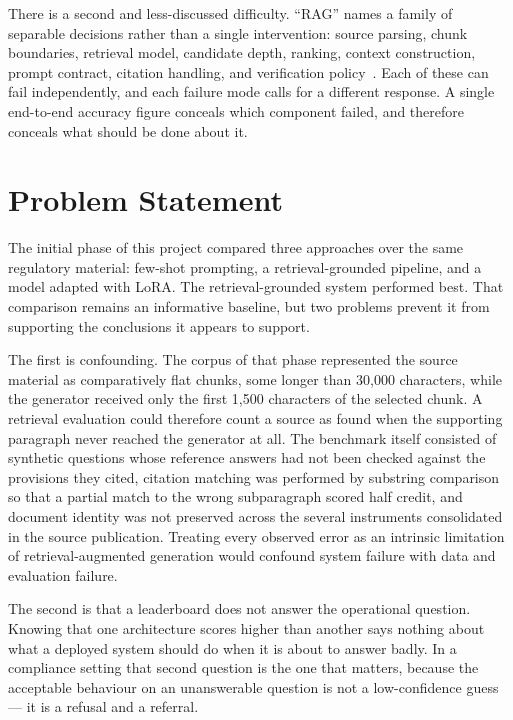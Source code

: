 There is a second and less-discussed difficulty. ``\ac{RAG}'' names a family of separable decisions rather than a single intervention: source parsing, chunk boundaries, retrieval model, candidate depth, ranking, context construction, prompt contract, citation handling, and verification policy~\cite{gao2023ragsurvey}. Each of these can fail independently, and each failure mode calls for a different response. A single end-to-end accuracy figure conceals which component failed, and therefore conceals what should be done about it.

\section{Problem Statement}
\label{sec:intro-problem}

The initial phase of this project compared three approaches over the same regulatory material: few-shot prompting, a retrieval-grounded pipeline, and a model adapted with \ac{LoRA}. The retrieval-grounded system performed best. That comparison remains an informative baseline, but two problems prevent it from supporting the conclusions it appears to support.

The first is confounding. The corpus of that phase represented the source material as comparatively flat chunks, some longer than 30{,}000 characters, while the generator received only the first 1{,}500 characters of the selected chunk. A retrieval evaluation could therefore count a source as found when the supporting paragraph never reached the generator at all. The benchmark itself consisted of synthetic questions whose reference answers had not been checked against the provisions they cited, citation matching was performed by substring comparison so that a partial match to the wrong subparagraph scored half credit, and document identity was not preserved across the several instruments consolidated in the source publication. Treating every observed error as an intrinsic limitation of retrieval-augmented generation would confound system failure with data and evaluation failure.

The second is that a leaderboard does not answer the operational question. Knowing that one architecture scores higher than another says nothing about what a deployed system should do when it is about to answer badly. In a compliance setting that second question is the one that matters, because the acceptable behaviour on an unanswerable question is not a low-confidence guess --- it is a refusal and a referral.

